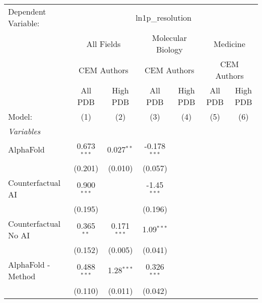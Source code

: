 \begingroup
\centering
\begin{tabular}{lcccccc}
   \tabularnewline \midrule \midrule
   Dependent Variable: & \multicolumn{6}{c}{ln1p\_resolution}\\
 & \multicolumn{2}{c}{All Fields} & \multicolumn{2}{c}{Molecular Biology} & \multicolumn{2}{c}{Medicine} \\
\cmidrule(lr){2-3} \cmidrule(lr){4-5} \cmidrule(lr){6-7}
 & \multicolumn{2}{c}{CEM Authors} & \multicolumn{2}{c}{CEM Authors} & \multicolumn{2}{c}{CEM Authors} \\
\cmidrule(lr){2-3} \cmidrule(lr){4-5} \cmidrule(lr){6-7}
 & \multicolumn{1}{c}{All PDB} & \multicolumn{1}{c}{High PDB} & \multicolumn{1}{c}{All PDB} & \multicolumn{1}{c}{High PDB} & \multicolumn{1}{c}{All PDB} & \multicolumn{1}{c}{High PDB} \\
\cmidrule(lr){2-2} \cmidrule(lr){3-3} \cmidrule(lr){4-4} \cmidrule(lr){5-5} \cmidrule(lr){6-6} \cmidrule(lr){7-7}
   Model:                                                     & (1)           & (2)           & (3)            & (4) & (5) & (6)\\  
   \midrule
   \emph{Variables}\\
   AlphaFold                                                  & 0.673$^{***}$ & 0.027$^{**}$  & -0.178$^{***}$ &     &     &   \\   
                                                              & (0.201)       & (0.010)       & (0.057)        &     &     &   \\   
   Counterfactual AI                                          & 0.900$^{***}$ &               & -1.45$^{***}$  &     &     &   \\   
                                                              & (0.195)       &               & (0.196)        &     &     &   \\   
   Counterfactual No AI                                       & 0.365$^{**}$  & 0.171$^{***}$ & 1.09$^{***}$   &     &     &   \\   
                                                              & (0.152)       & (0.005)       & (0.041)        &     &     &   \\   
   AlphaFold - Method                                         & 0.488$^{***}$ & 1.28$^{***}$  & 0.326$^{***}$  &     &     &   \\   
                                                              & (0.110)       & (0.011)       & (0.042)        &     &     &   \\   

\end{tabular}

